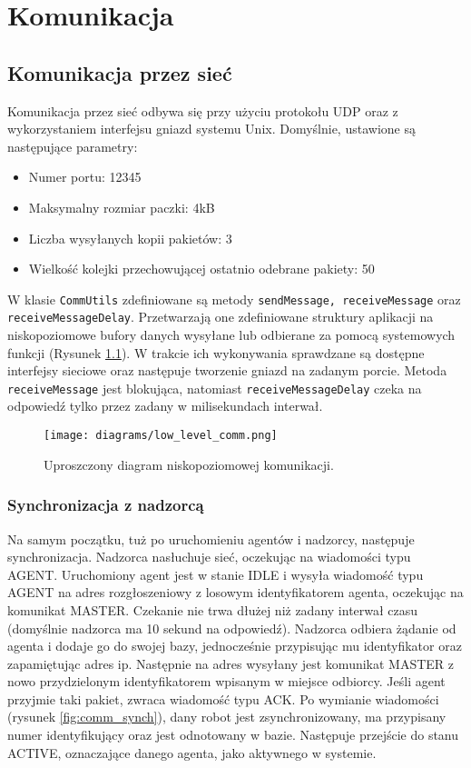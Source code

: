 \chapter{Komunikacja}
\label{ch:komunikacja}

\section{Komunikacja przez sieć}

Komunikacja przez sieć odbywa się przy użyciu protokołu UDP oraz z wykorzystaniem interfejsu gniazd systemu Unix. Domyślnie, ustawione są następujące parametry:
\begin{itemize}
    \item Numer portu: 12345
    \item Maksymalny rozmiar paczki: 4kB
    \item Liczba wysyłanych kopii pakietów: 3
    \item Wielkość kolejki przechowującej ostatnio odebrane pakiety: 50
\end{itemize}

W klasie {\tt CommUtils} zdefiniowane są metody {\tt sendMessage, receiveMessage} oraz {\tt receiveMessageDelay}. Przetwarzają one zdefiniowane struktury aplikacji na niskopoziomowe bufory danych wysyłane lub odbierane za pomocą systemowych funkcji (Rysunek \ref{fig:low_level_comm}). W trakcie ich wykonywania sprawdzane są dostępne interfejsy sieciowe oraz następuje tworzenie gniazd na zadanym porcie. Metoda {\tt receiveMessage} jest blokująca, natomiast {\tt receiveMessageDelay} czeka na odpowiedź tylko przez zadany w milisekundach interwał.

\begin{figure}[!ht]
    \centering
        \texttt{[image: diagrams/low\_level\_comm.png]}
    \caption{Uproszczony diagram niskopoziomowej komunikacji.\label{fig:low_level_comm}}
\end{figure}

\subsection{Synchronizacja z nadzorcą}

Na samym początku, tuż po uruchomieniu agentów i nadzorcy, następuje synchronizacja. Nadzorca nasłuchuje sieć, oczekując na wiadomości typu AGENT. Uruchomiony agent jest w stanie IDLE i wysyła wiadomość typu AGENT na adres rozgłoszeniowy z losowym identyfikatorem agenta, oczekując na komunikat MASTER. Czekanie nie trwa dłużej niż zadany interwał czasu (domyślnie nadzorca ma 10 sekund na odpowiedź). Nadzorca odbiera żądanie od agenta i dodaje go do swojej bazy, jednocześnie przypisując mu identyfikator oraz zapamiętując adres ip. Następnie na adres wysyłany jest komunikat MASTER z nowo przydzielonym identyfikatorem wpisanym w miejsce odbiorcy. Jeśli agent przyjmie taki pakiet, zwraca wiadomość typu ACK. Po wymianie wiadomości (rysunek \ref{fig:comm_synch}), dany robot jest zsynchronizowany, ma przypisany numer identyfikujący oraz jest odnotowany w bazie. Następuje przejście do stanu ACTIVE, oznaczające danego agenta, jako aktywnego w systemie.

